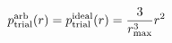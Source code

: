 \documentclass[12pt]{article}
\begin{document}
\begin{displaymath}
p_{\rm trial}^{\rm arb}(r) = p_{\rm trial}^{\rm ideal}(r) = {{3}\over{r_{\rm max}^3}} r^2
\end{displaymath}
\end{document}
